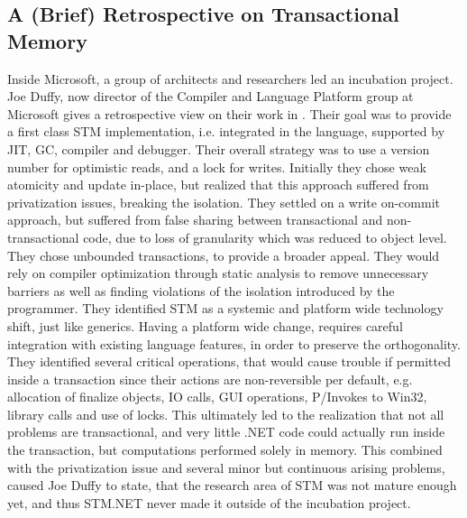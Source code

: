 \subsection{A (Brief) Retrospective on Transactional Memory}
Inside Microsoft, a group of architects and researchers led an incubation project. Joe Duffy, now director of the Compiler and Language Platform group at Microsoft gives a retrospective view on their work in \cite{duffy2010stmnet}. Their goal was to provide a first class \ac{STM} implementation, i.e. integrated in the language, supported by \ac{JIT}, \ac{GC}, compiler and debugger. Their overall strategy was to use a version number for optimistic reads, and a lock for writes. Initially they chose weak atomicity and update in-place, but realized that this approach suffered from privatization issues, breaking the isolation. They settled on a write on-commit approach, but suffered from false sharing between transactional and non-transactional code, due to loss of granularity which was reduced to object level. They chose unbounded transactions, to provide a broader appeal. They would rely on compiler optimization through static analysis to remove unnecessary barriers as well as finding violations of the isolation introduced by the programmer. They identified \ac{STM} as a systemic and platform wide technology shift, just like generics. Having a platform wide change, requires careful integration with existing language features, in order to preserve the orthogonality. They identified several critical operations, that would cause trouble if permitted inside a transaction since their actions are non-reversible per default, e.g. allocation of finalize objects, \ac{IO} calls, GUI operations, P/Invokes to Win32, library calls and use of locks. This ultimately led to the realization that not all problems are transactional, and very little .NET code could actually run inside the transaction, but computations performed solely in memory. This combined with the privatization issue and several minor but continuous arising problems, caused Joe Duffy to state, that the research area of \ac{STM} was not mature enough yet, and thus STM.NET never made it outside of the incubation project.


